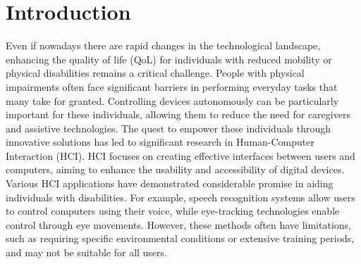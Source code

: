 \chapter{Introduction}\label{ch:introduction}



Even if nowadays there are rapid changes in the technological landscape, enhancing the quality of life (QoL) for individuals with reduced mobility or physical disabilities remains a critical challenge. 
People with physical impairments often face significant barriers in performing everyday tasks that many take for granted. 
Controlling devices autonomously can be particularly important for these individuals, allowing them to reduce the need for caregivers and assistive technologies.
The quest to empower these individuals through innovative solutions has led to significant research in Human-Computer Interaction (HCI).
HCI focuses on creating effective interfaces between users and computers, aiming to enhance the usability and accessibility of digital devices. 
Various HCI applications have demonstrated considerable promise in aiding individuals with disabilities. 
For example, speech recognition systems allow users to control computers using their voice, while eye-tracking technologies enable control through eye movements. 
However, these methods often have limitations, such as requiring specific environmental conditions or extensive training periods, and may not be suitable for all users.

